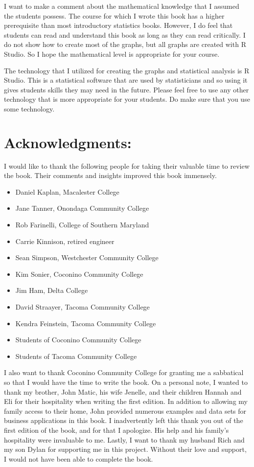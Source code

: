 \documentclass[
]{book}
\providecommand{\tightlist}{%
  \setlength{\itemsep}{0pt}\setlength{\parskip}{0pt}}
\begin{document}
I want to make a comment about the mathematical knowledge that I assumed the students possess. The course for which I wrote this book has a higher prerequisite than most introductory statistics books. However, I do feel that students can read and understand this book as long as they can read critically. I do not show how to create most of the graphs, but all graphs are created with R Studio. So I hope the mathematical level is appropriate for your course.

The technology that I utilized for creating the graphs and statistical analysis is R Studio. This is a statistical software that are used by statisticians and so using it gives students skills they may need in the future. Please feel free to use any other technology that is more appropriate for your students. Do make sure that you use some technology.

\hypertarget{acknowledgments}{%
\section{Acknowledgments:}\label{acknowledgments}}

I would like to thank the following people for taking their valuable time to review the book. Their comments and insights improved this book immensely.

\begin{itemize}
\tightlist
\item
  Daniel Kaplan, Macalester College
\item
  Jane Tanner, Onondaga Community College
\item
  Rob Farinelli, College of Southern Maryland
\item
  Carrie Kinnison, retired engineer
\item
  Sean Simpson, Westchester Community College
\item
  Kim Sonier, Coconino Community College
\item
  Jim Ham, Delta College
\item
  David Straayer, Tacoma Community College
\item
  Kendra Feinstein, Tacoma Community College
\item
  Students of Coconino Community College
\item
  Students of Tacoma Community College
\end{itemize}

I also want to thank Coconino Community College for granting me a sabbatical so that I would have the time to write the book. On a personal note, I wanted to thank my brother, John Matic, his wife Jenelle, and their children Hannah and Eli for their hospitality when writing the first edition. In addition to allowing my family access to their home, John provided numerous examples and data sets for business applications in this book. I inadvertently left this thank you out of the first edition of the book, and for that I apologize. His help and his family's hospitality were invaluable to me.
Lastly, I want to thank my husband Rich and my son Dylan for supporting me in this project. Without their love and support, I would not have been able to complete the book.
\end{document}
